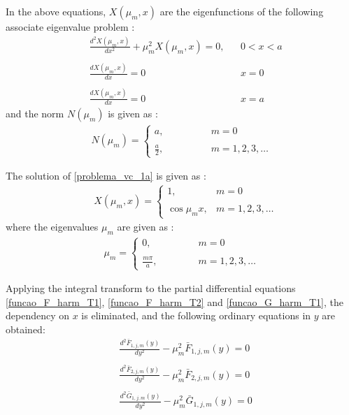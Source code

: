 \documentclass[12pt]{CHT-20}
\begin{document}
In the above equations, $X(\mu_m, x)$ are the eigenfunctions of the following associate eigenvalue problem \citep{livro_integral_transforms_cotta}:
\begin{subequations}
	\begin{alignat}{2}
	& \frac{d^2 X(\mu_m, x)}{d x^2} + \mu_m^2 X(\mu_m, x) = 0, && 0 < x < a \label{problema_vc_1a} \\ \nonumber \\
	& \frac{d X(\mu_m, x)}{d x} = 0 && x = 0 \label{problema_vc_1b} \\ \nonumber \\
	& \frac{d X(\mu_m, x)}{d x} = 0 && x = a \label{problema_vc_1c}
	\end{alignat}
\end{subequations}
and the norm $N(\mu_m)$ is given as \citep{livro_integral_transforms_cotta}:
\begin{align}
N(\mu_m) = \left\lbrace
\begin{array}{ll}
a, \quad\quad\quad\quad & m = 0 \\ \\
\displaystyle\frac{a}{2}, & m = 1,2,3,\ldots
\end{array}
\right. \label{valor_integral_norm}
\end{align}

The solution of \eqref{problema_vc_1a} is given as \citep{livro_integral_transforms_cotta}:
\begin{align}
& X(\mu_m, x) = \left\lbrace
\begin{array}{ll}
1, & m = 0 \\ \\
\cos \mu_m x, & m = 1,2,3,\ldots
\end{array}
\right . \label{definicao_das_autofuncoes}
\end{align}
where the eigenvalues $\mu_m$ are given as \citep{livro_integral_transforms_cotta}:
\begin{align}
\mu_m = \left\lbrace
\begin{array}{ll}
0, \quad\quad\quad\quad & m = 0 \\ \\
\displaystyle\frac{m\pi}{a}, & m = 1,2,3,\ldots
\end{array}
\right.
\label{eigenvals}
\end{align}

Applying the integral transform to the partial differential equations \eqref{funcao_F_harm_T1}, \eqref{funcao_F_harm_T2} and \eqref{funcao_G_harm_T1}, the dependency on $x$ is eliminated, and the following ordinary equations in $y$ are obtained:
\begin{align}
& \frac{d^2 \bar{F}_{1,j,m}(y)}{d y^2}
-
\mu_m^2 \bar{F}_{1,j,m}(y) = 0 \label{eq_dif_ord_F1} \\ \nonumber \\
& \frac{d^2 \bar{F}_{2,j,m}(y)}{d y^2}
-
\mu_m^2 \bar{F}_{2,j,m}(y) = 0 \label{eq_dif_ord_F2} \\ \nonumber \\
& \frac{d^2 \bar{G}_{1,j,m}(y)}{d y^2}
-
\mu_m^2 \bar{G}_{1,j,m}(y) = 0 \label{eq_dif_ord_G1}
\end{align}
\end{document}
